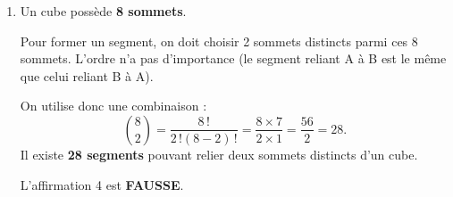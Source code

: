 \documentclass[10pt]{article}
\begin{document}
\begin{enumerate}
\smallskip
	
L'affirmation 3 est \textbf{FAUSSE}.
	\item Un cube possède \textbf{8 sommets}.
	
	Pour former un segment, on doit choisir 2 sommets distincts parmi ces 8 sommets. L'ordre n'a pas d'importance (le segment reliant A à B est le même que celui reliant B à A).
	
	On utilise donc une combinaison :
	\[\binom{8}{2} = \dfrac{8\,!}{2\,!(8-2)\,!} = \dfrac{8 \times 7}{2 \times 1} = \dfrac{56}{2} = 28.\]
	Il existe \textbf{28 segments} pouvant relier deux sommets distincts d'un cube.

	\smallskip
	
	L'affirmation 4 est \textbf{FAUSSE}.
\end{enumerate}


\bigskip
\end{document}
